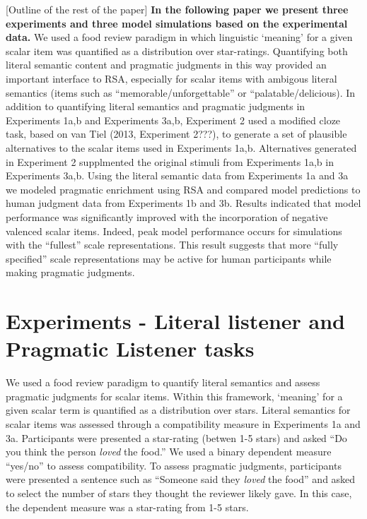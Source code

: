 \documentclass[10pt, letterpaper]{article}
\begin{document}
{[}Outline of the rest of the paper{]}\newline
\textbf{In the following paper we present three experiments and three model simulations based on the experimental data.}
We used a food review paradigm in which linguistic `meaning' for a given
scalar item was quantified as a distribution over star-ratings.
Quantifying both literal semantic content and pragmatic judgments in
this way provided an important interface to RSA, especially for scalar
items with ambigous literal semantics (items such as
``memorable/unforgettable'' or ``palatable/delicious). In addition to
quantifying literal semantics and pragmatic judgments in Experiments
1a,b and Experiments 3a,b, Experiment 2 used a modified cloze task,
based on van Tiel (2013, Experiment 2???), to generate a set of
plausible alternatives to the scalar items used in Experiments 1a,b.
Alternatives generated in Experiment 2 supplmented the original stimuli
from Experiments 1a,b in Experiments 3a,b. Using the literal semantic
data from Experiments 1a and 3a we modeled pragmatic enrichment using
RSA and compared model predictions to human judgment data from
Experiments 1b and 3b. Results indicated that model performance was
significantly improved with the incorporation of negative valenced
scalar items. Indeed, peak model performance occurs for simulations with
the ``fullest'' scale representations. This result suggests that more
``fully specified'' scale representations may be active for human
participants while making pragmatic judgments.

\section{Experiments - Literal listener and Pragmatic Listener
tasks}\label{experiments---literal-listener-and-pragmatic-listener-tasks}

We used a food review paradigm to quantify literal semantics and assess
pragmatic judgments for scalar items. Within this framework, `meaning'
for a given scalar term is quantified as a distribution over stars.
Literal semantics for scalar items was assessed through a compatibility
measure in Experiments 1a and 3a. Participants were presented a
star-rating (betwen 1-5 stars) and asked ``Do you think the person
\emph{loved} the food.'' We used a binary dependent measure ``yes/no''
to assess compatibility. To assess pragmatic judgments, participants
were presented a sentence such as ``Someone said they \emph{loved} the
food'' and asked to select the number of stars they thought the reviewer
likely gave. In this case, the dependent measure was a star-rating from
1-5 stars.
\end{document}
